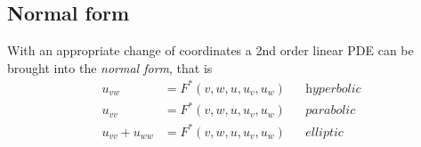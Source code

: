 \subsection{Normal form}
With an appropriate change of coordinates a 2nd order linear PDE can be brought into the \textit{normal form}, that is
\begin{align*}
    u_{vw}          & = F^{*}(v,w,u,u_v,u_w) &  & \textit{hyperbolic} \\
    u_{vv}          & = F^{*}(v,w,u,u_v,u_w) &  & \textit{parabolic}  \\
    u_{vv} + u_{ww} & = F^{*}(v,w,u,u_v,u_w) &  & \textit{elliptic}
\end{align*}